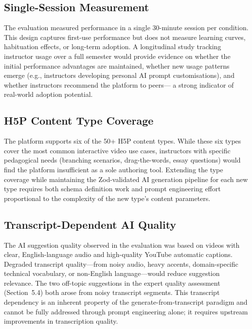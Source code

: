 \subsection{Single-Session Measurement}

The evaluation measured performance in a single 30-minute session per
condition. This design captures first-use performance but does not measure
learning curves, habituation effects, or long-term adoption. A longitudinal
study tracking instructor usage over a full semester would provide evidence
on whether the initial performance advantages are maintained, whether new
usage patterns emerge (e.g., instructors developing personal AI prompt
customisations), and whether instructors recommend the platform to peers---
a strong indicator of real-world adoption potential.

\subsection{H5P Content Type Coverage}

The platform supports six of the 50+ H5P content types. While these six
types cover the most common interactive video use cases, instructors with
specific pedagogical needs (branching scenarios, drag-the-words, essay
questions) would find the platform insufficient as a sole authoring tool.
Extending the type coverage while maintaining the Zod-validated AI
generation pipeline for each new type requires both schema definition work
and prompt engineering effort proportional to the complexity of the new
type's content parameters.

\subsection{Transcript-Dependent AI Quality}

The AI suggestion quality observed in the evaluation was based on videos
with clear, English-language audio and high-quality YouTube automatic
captions. Degraded transcript quality---from noisy audio, heavy accents,
domain-specific technical vocabulary, or non-English language---would
reduce suggestion relevance. The two off-topic suggestions in the expert
quality assessment (Section~5.4) both arose from noisy transcript segments.
This transcript dependency is an inherent property of the generate-from-transcript
paradigm and cannot be fully addressed through prompt engineering alone;
it requires upstream improvements in transcription quality.

